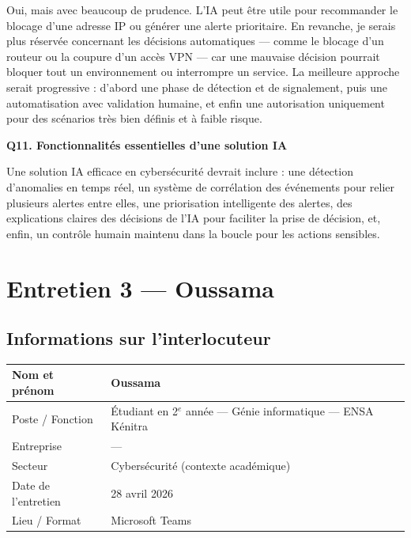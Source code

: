 \documentclass[12pt,a4paper]{article}
\begin{document}
Oui, mais avec beaucoup de prudence. L'IA peut \^{e}tre utile pour recommander le blocage d'une
adresse IP ou g\'{e}n\'{e}rer une alerte prioritaire. En revanche, je serais plus r\'{e}serv\'{e}e concernant
les d\'{e}cisions automatiques --- comme le blocage d'un routeur ou la coupure d'un acc\`{e}s VPN
--- car une mauvaise d\'{e}cision pourrait bloquer tout un environnement ou interrompre un service.
La meilleure approche serait progressive : d'abord une phase de d\'{e}tection et de signalement,
puis une automatisation avec validation humaine, et enfin une autorisation uniquement pour des
sc\'{e}narios tr\`{e}s bien d\'{e}finis et \`{a} faible risque.

\bigskip
\textbf{Q11. Fonctionnalit\'{e}s essentielles d'une solution IA}

Une solution IA efficace en cybers\'{e}curit\'{e} devrait inclure : une d\'{e}tection d'anomalies en temps
r\'{e}el, un syst\`{e}me de corr\'{e}lation des \'{e}v\'{e}nements pour relier plusieurs alertes entre elles, une
priorisation intelligente des alertes, des explications claires des d\'{e}cisions de l'IA pour faciliter
la prise de d\'{e}cision, et, enfin, un contr\^{o}le humain maintenu dans la boucle pour les actions
sensibles.

\clearpage

\section{Entretien 3 --- Oussama}

\subsection*{Informations sur l'interlocuteur}

\begin{tabular}{@{}B{4cm} L{10.5cm}@{}}
  \hline
  Nom et pr\'{e}nom      & Oussama \\
  \hline
  Poste / Fonction   & \'{E}tudiant en 2$^{e}$ ann\'{e}e --- G\'{e}nie informatique --- ENSA K\'{e}nitra \\
  \hline
  Entreprise         & --- \\
  \hline
  Secteur            & Cybers\'{e}curit\'{e} (contexte acad\'{e}mique) \\
  \hline
  Date de l'entretien & 28 avril 2026 \\
  \hline
  Lieu / Format      & Microsoft Teams \\
  \hline
\end{tabular}
\end{document}
